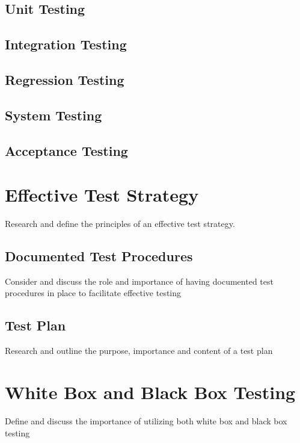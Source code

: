 \documentclass[12pt]{article}
\begin{document}
\subsection{Unit Testing}

\subsection{Integration Testing}

\subsection{Regression Testing}

\subsection{System Testing}

\subsection{Acceptance Testing}



\section{Effective Test Strategy}
Research and define the principles of an effective test strategy.

\subsection{Documented Test Procedures}
Consider and discuss the role and importance of having documented test procedures in place to facilitate effective testing

\subsection{Test Plan}
Research and outline the purpose, importance and content of a test plan



\section{White Box and Black Box Testing} \label{blackwhitebox}
Define and discuss the importance of utilizing both white box and black box testing



\pagebreak
\end{document}
